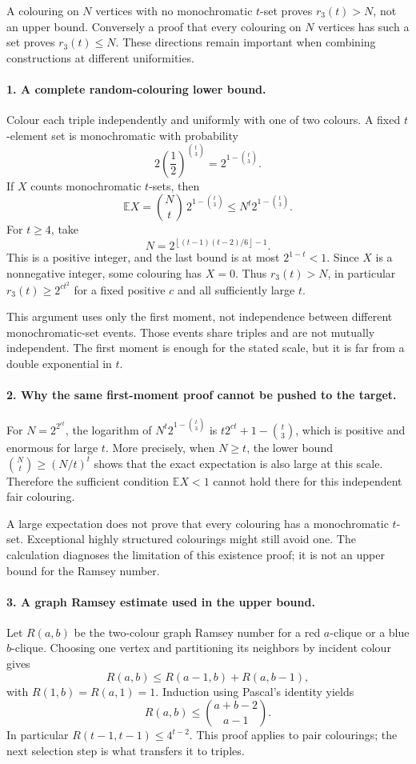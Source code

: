 \documentclass[11pt]{article}
\begin{document}
A colouring on $N$ vertices with no monochromatic $t$-set proves $r_3(t)>N$, not an upper bound. Conversely a proof that every colouring on $N$ vertices has such a set proves $r_3(t)\le N$. These directions remain important when combining constructions at different uniformities.

\paragraph{1. A complete random-colouring lower bound.}
Colour each triple independently and uniformly with one of two colours. A fixed $t$-element set is monochromatic with probability
\[
 2\left(\frac12\right)^{\binom t3}=2^{1-\binom t3}.
\]
If $X$ counts monochromatic $t$-sets, then
\[
 \mathbb EX=\binom Nt\,2^{1-\binom t3}
 \le N^t2^{1-\binom t3}.
\]
For $t\ge4$, take
\[
 N=2^{\left\lfloor (t-1)(t-2)/6\right\rfloor-1}.
\]
This is a positive integer, and the last bound is at most $2^{1-t}<1$. Since $X$ is a nonnegative integer, some colouring has $X=0$. Thus $r_3(t)>N$, in particular $r_3(t)\ge2^{ct^2}$ for a fixed positive $c$ and all sufficiently large $t$.

This argument uses only the first moment, not independence between different monochromatic-set events. Those events share triples and are not mutually independent. The first moment is enough for the stated scale, but it is far from a double exponential in $t$.

\paragraph{2. Why the same first-moment proof cannot be pushed to the target.}
For $N=2^{2^{ct}}$, the logarithm of $N^t2^{1-\binom t3}$ is $t2^{ct}+1-\binom t3$, which is positive and enormous for large $t$. More precisely, when $N\ge t$, the lower bound $\binom Nt\ge(N/t)^t$ shows that the exact expectation is also large at this scale. Therefore the sufficient condition $\mathbb EX<1$ cannot hold there for this independent fair colouring.

A large expectation does not prove that every colouring has a monochromatic $t$-set. Exceptional highly structured colourings might still avoid one. The calculation diagnoses the limitation of this existence proof; it is not an upper bound for the Ramsey number.

\paragraph{3. A graph Ramsey estimate used in the upper bound.}
Let $R(a,b)$ be the two-colour graph Ramsey number for a red $a$-clique or a blue $b$-clique. Choosing one vertex and partitioning its neighbors by incident colour gives
\[
 R(a,b)\le R(a-1,b)+R(a,b-1),
\]
with $R(1,b)=R(a,1)=1$. Induction using Pascal's identity yields
\[
 R(a,b)\le\binom{a+b-2}{a-1}.
\]
In particular $R(t-1,t-1)\le4^{t-2}$. This proof applies to pair colourings; the next selection step is what transfers it to triples.
\end{document}
